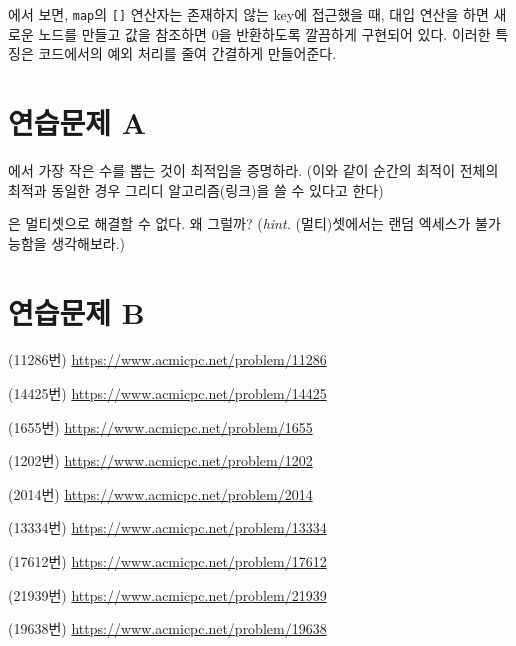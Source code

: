 에서 보면, \texttt{map}의 \texttt{[]} 연산자는 존재하지 않는 key에 접근했을 때, 대입 연산을 하면 새로운 노드를 만들고 값을 참조하면 $0$을 반환하도록 깔끔하게 구현되어 있다. 이러한 특징은 코드에서의 예외 처리를 줄여 간결하게 만들어준다.

\section{연습문제 A}
\begin{problem} \label{pb: add-number-proof}
    에서 가장 작은 수를 뽑는 것이 최적임을 증명하라. (이와 같이 순간의 최적이 전체의 최적과 동일한 경우 그리디 알고리즘(링크)을 쓸 수 있다고 한다)
\end{problem}
\begin{problem}
    은 멀티셋으로 해결할 수 없다. 왜 그럴까? (\textit{hint.} (멀티)셋에서는 랜덤 엑세스가 불가능함을 생각해보라.)
\end{problem}

\section{연습문제 B}
\begin{problem}
    (11286번) \url{https://www.acmicpc.net/problem/11286}
\end{problem}
\begin{problem}
    (14425번) \url{https://www.acmicpc.net/problem/14425}
\end{problem}
\begin{problem}
    (1655번) \url{https://www.acmicpc.net/problem/1655}
\end{problem}
\begin{problem}
    (1202번) \url{https://www.acmicpc.net/problem/1202}
\end{problem}
\begin{problem}
    (2014번) \url{https://www.acmicpc.net/problem/2014}
\end{problem}
\begin{problem}
    (13334번) \url{https://www.acmicpc.net/problem/13334}
\end{problem}
\begin{problem}
    (17612번) \url{https://www.acmicpc.net/problem/17612}
\end{problem}
\begin{problem}
    (21939번) \url{https://www.acmicpc.net/problem/21939}
\end{problem}
\begin{problem}
    (19638번) \url{https://www.acmicpc.net/problem/19638}
\end{problem}

